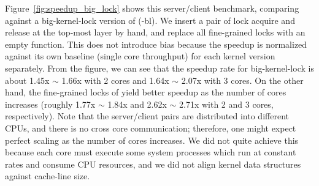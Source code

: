 Figure~\ref{fig:speedup_big_lock} shows this server/client benchmark,
comparing {\mCTOS} against a big-kernel-lock version of {\mCTOS}
({\mCTOS-bl}). We insert a pair of lock acquire and release at the
top-most layer by hand, and replace all fine-grained locks with an
empty function. This does not introduce bias because the speedup is
normalized against its own baseline (single core throughput) for each
kernel version separately. From the figure, we can see that the
speedup rate for big-kernel-lock is about 1.45x $\sim$ 1.66x with 2
cores and 1.64x $\sim$ 2.07x with 3 cores. On the other hand, the
fine-grained locks of {\mCTOS} yield better speedup as the number of
cores increases (roughly 1.77x $\sim$ 1.84x and 2.62x $\sim$ 2.71x
with 2 and 3 cores, respectively). Note that the server/client pairs
are distributed into different CPUs, and there is no cross core
communication; therefore, one might expect perfect scaling as the
number of cores increases.  We did not quite achieve this
because each core must execute some system processes which run
at constant rates and consume CPU resources, and we did not align
kernel data structures against cache-line size.



